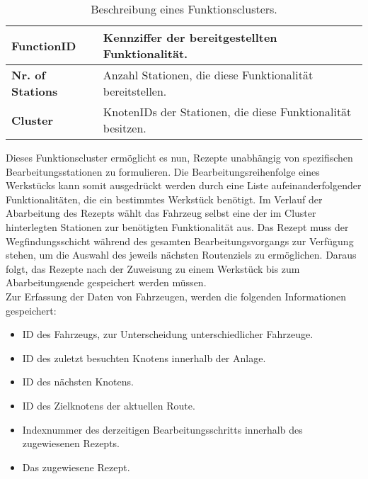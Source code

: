 			\begin{table}[h]
				\begin{longtable}{| l | l |}
					
					\hline
					\textbf{FunctionID} & Kennziffer der bereitgestellten Funktionalität.\\ \hline
					\textbf{Nr. of Stations} & Anzahl Stationen, die diese Funktionalität bereitstellen.\\ \hline
					\textbf{Cluster} & KnotenIDs der Stationen, die diese Funktionalität besitzen.\\
					\hline
					
				\end{longtable}
				\vspace{0.2cm}
				\caption{Beschreibung eines Funktionsclusters.}
			\end{table}
			
			Dieses Funktionscluster ermöglicht es nun, Rezepte unabhängig von spezifischen Bearbeitungsstationen zu formulieren. Die Bearbeitungsreihenfolge eines Werkstücks kann somit ausgedrückt werden durch eine Liste aufeinanderfolgender Funktionalitäten, die ein bestimmtes Werkstück benötigt. Im Verlauf der Abarbeitung des Rezepts wählt das Fahrzeug selbst eine der im Cluster hinterlegten Stationen zur benötigten Funktionalität aus. Das Rezept muss der Wegfindungsschicht während des gesamten Bearbeitungsvorgangs zur Verfügung stehen, um die Auswahl des jeweils nächsten Routenziels zu ermöglichen. Daraus folgt, das Rezepte nach der Zuweisung zu einem Werkstück bis zum Abarbeitungsende gespeichert werden müssen.
			\\[4pt]
			Zur Erfassung der Daten von Fahrzeugen, werden die folgenden Informationen gespeichert:
			
			\begin{itemize}
				\item ID des Fahrzeugs, zur Unterscheidung unterschiedlicher Fahrzeuge.
				\item ID des zuletzt besuchten Knotens innerhalb der Anlage.
				\item ID des nächsten Knotens. 
				\item ID des Zielknotens der aktuellen Route.
				\item Indexnummer des derzeitigen Bearbeitungsschritts innerhalb des zugewiesenen Rezepts.
				\item Das zugewiesene Rezept.
			\end{itemize} 
			
